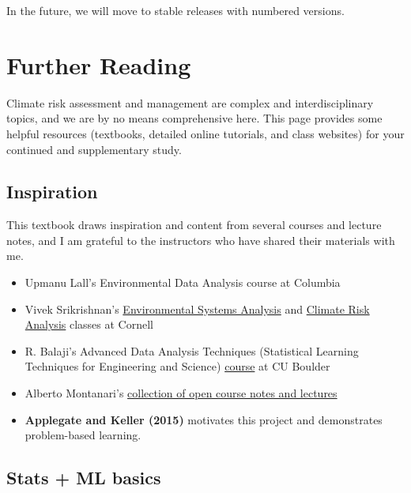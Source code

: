 \documentclass[
  letterpaper,
  DIV=11,
  numbers=noendperiod]{scrreprt}
\providecommand{\tightlist}{%
  \setlength{\itemsep}{0pt}\setlength{\parskip}{0pt}}
\begin{document}
In the future, we will move to stable releases with numbered versions.

\chapter*{Further Reading}\label{further-reading}


Climate risk assessment and management are complex and interdisciplinary
topics, and we are by no means comprehensive here. This page provides
some helpful resources (textbooks, detailed online tutorials, and class
websites) for your continued and supplementary study.

\section*{Inspiration}\label{inspiration}


This textbook draws inspiration and content from several courses and
lecture notes, and I am grateful to the instructors who have shared
their materials with me.

\begin{itemize}
\tightlist
\item
  Upmanu Lall's Environmental Data Analysis course at Columbia
\item
  Vivek Srikrishnan's
  \href{https://viveks.me/environmental-systems-analysis/}{Environmental
  Systems Analysis} and
  \href{https://viveks.me/climate-risk-analysis/}{Climate Risk Analysis}
  classes at Cornell
\item
  R. Balaji's Advanced Data Analysis Techniques (Statistical Learning
  Techniques for Engineering and Science)
  \href{https://civil.colorado.edu/~balajir/CVEN6833/}{course} at CU
  Boulder
\item
  Alberto Montanari's
  \href{https://www.albertomontanari.it/lectures}{collection of open
  course notes and lectures}
\item
  \textbf{Applegate and Keller (2015)} motivates this project and
  demonstrates problem-based learning.
\end{itemize}

\section*{Stats + ML basics}\label{stats-ml-basics}
\end{document}
